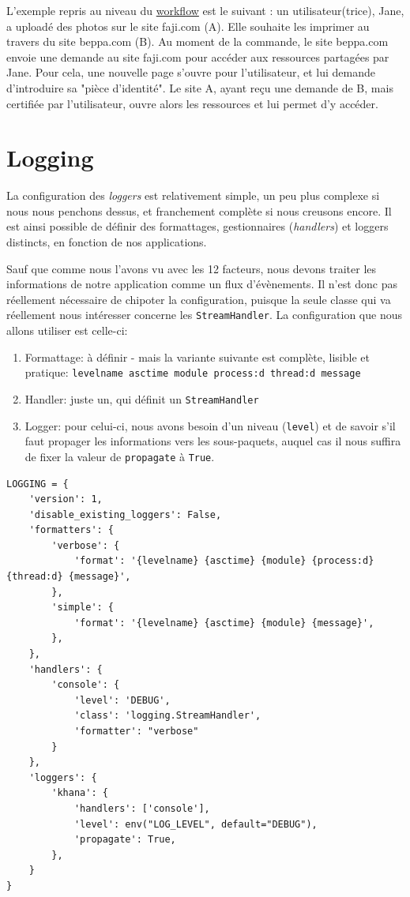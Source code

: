 \documentclass[11pt]{amsbook}
\begin{document}
L’exemple repris au niveau du \href{http://hueniverse.com/oauth/guide/workflow/}{workflow} est le suivant : un utilisateur(trice), Jane, a uploadé des photos sur le site faji.com (A). Elle souhaite les imprimer au travers du site beppa.com (B).
Au moment de la commande, le site beppa.com envoie une demande au site faji.com pour accéder aux ressources partagées par Jane. Pour cela, une nouvelle page s’ouvre pour l’utilisateur, et lui demande d’introduire sa "pièce d’identité". Le site A, ayant reçu une demande de B, mais certifiée par l’utilisateur, ouvre alors les ressources et lui permet d’y accéder.


\hypertarget{x-logging}{\chapter{Logging}}
La configuration des \emph{loggers} est relativement simple, un peu plus complexe si nous nous penchons dessus, et franchement complète si nous creusons encore.
Il est ainsi possible de définir des formattages, gestionnaires (\emph{handlers}) et loggers distincts, en fonction de nos applications.


Sauf que comme nous l’avons vu avec les 12 facteurs, nous devons traiter les informations de notre application comme un flux d’évènements.
Il n’est donc pas réellement nécessaire de chipoter la configuration, puisque la seule classe qui va réellement nous intéresser concerne les \texttt{StreamHandler}.
La configuration que nous allons utiliser est celle-ci:


\begin{enumerate}

\item{Formattage: à définir - mais la variante suivante est complète, lisible et pratique: \texttt{{levelname} {asctime} {module} {process:d} {thread:d} {message}}}

\item{Handler: juste un, qui définit un \texttt{StreamHandler}}

\item{Logger: pour celui-ci, nous avons besoin d’un niveau (\texttt{level}) et de savoir s’il faut propager les informations vers les sous-paquets, auquel cas il nous suffira de fixer la valeur de \texttt{propagate} à \texttt{True}.}

\end{enumerate}


\begin{verbatim}
LOGGING = {
    'version': 1,
    'disable_existing_loggers': False,
    'formatters': {
        'verbose': {
            'format': '{levelname} {asctime} {module} {process:d} {thread:d} {message}',
        },
        'simple': {
            'format': '{levelname} {asctime} {module} {message}',
        },
    },
    'handlers': {
        'console': {
            'level': 'DEBUG',
            'class': 'logging.StreamHandler',
            'formatter': "verbose"
        }
    },
    'loggers': {
        'khana': {
            'handlers': ['console'],
            'level': env("LOG_LEVEL", default="DEBUG"),
            'propagate': True,
        },
    }
}
\end{verbatim}
\end{document}
